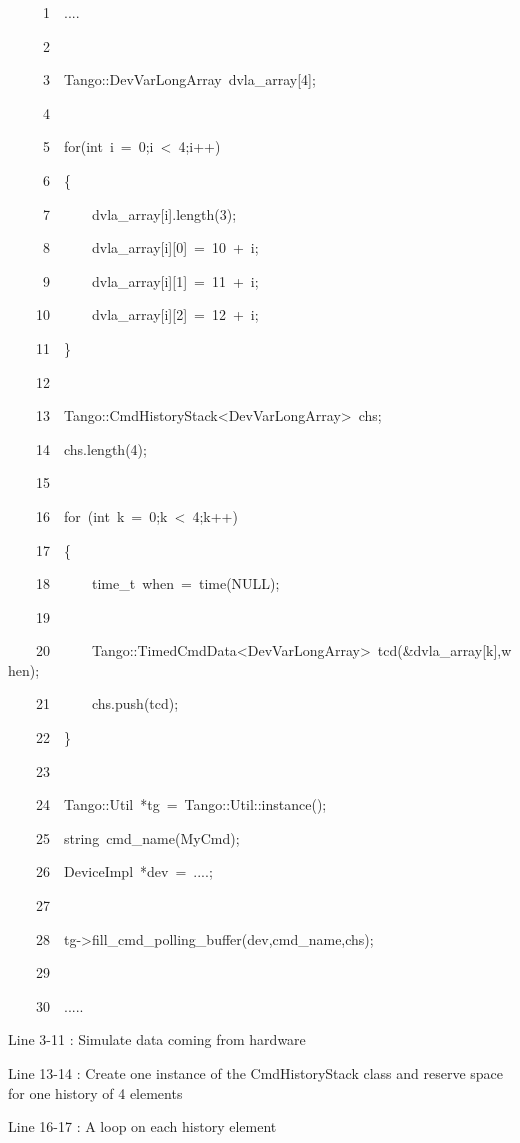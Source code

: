 
\begin{lyxcode}
~~~~~1~~....

~~~~~2~~

~~~~~3~~Tango::DevVarLongArray~dvla\_array{[}4{]};

~~~~~4~~~~~~~~~~

~~~~~5~~for(int~i~=~0;i~<~4;i++)

~~~~~6~~\{

~~~~~7~~~~~~dvla\_array{[}i{]}.length(3);

~~~~~8~~~~~~dvla\_array{[}i{]}{[}0{]}~=~10~+~i;

~~~~~9~~~~~~dvla\_array{[}i{]}{[}1{]}~=~11~+~i;

~~~~10~~~~~~dvla\_array{[}i{]}{[}2{]}~=~12~+~i;

~~~~11~~\}

~~~~12~~

~~~~13~~Tango::CmdHistoryStack<DevVarLongArray>~chs;

~~~~14~~chs.length(4);

~~~~15~~

~~~~16~~for~(int~k~=~0;k~<~4;k++)

~~~~17~~\{

~~~~18~~~~~~time\_t~when~=~time(NULL);

~~~~19~~

~~~~20~~~~~~Tango::TimedCmdData<DevVarLongArray>~tcd(\&dvla\_array{[}k{]},when);

~~~~21~~~~~~chs.push(tcd);

~~~~22~~\}

~~~~23~~

~~~~24~~Tango::Util~{*}tg~=~Tango::Util::instance();

~~~~25~~string~cmd\_name(\textquotedbl{}MyCmd\textquotedbl{});

~~~~26~~DeviceImpl~{*}dev~=~....;

~~~~27~~

~~~~28~~tg->fill\_cmd\_polling\_buffer(dev,cmd\_name,chs);

~~~~29~~

~~~~30~~.....


\end{lyxcode}


Line 3-11 : Simulate data coming from hardware

Line 13-14 : Create one instance of the CmdHistoryStack class and
reserve space for one history of 4 elements

Line 16-17 : A loop on each history element

